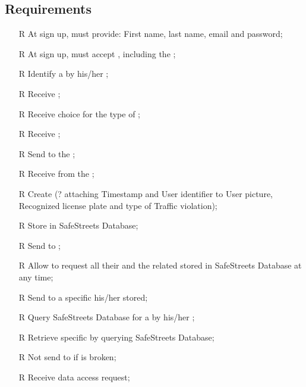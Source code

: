 \documentclass[../../../rasd.tex]{subfiles}
\begin{document}
\subsection{Requirements\label{sect:3.2.5}}
\begin{itemize}
	
	
	\item[R\subs{1}]At sign up,  must provide: First name, last name, email and password;
	\item[R\subs{2}]At sign up,  must accept , including the ;
	\item[R\subs{3}]Identify a  by his/her ;
	\item[R\subs{4}]Receive ;
	\item[R\subs{5}]Receive  choice for the type of ;
	\item[R\subs{6}]Receive ;
	\item[R\subs{7}]Send  to the ;
	\item[R\subs{8}]Receive  from the ;
	\item[R\subs{9}]Create  (? attaching Timestamp and User identifier to User picture, Recognized license plate and type of Traffic violation);
	\item[R\subs{10}]Store  in SafeStreets Database;
	\item[R\subs{11}]Send  to ;
	\item[R\subs{12a}]Allow  to request all their  and the related  stored in SafeStreets Database at any time;
	\item[R\subs{12b}]Send to a specific  his/her  stored;
	\item[R\subs{13}]Query SafeStreets Database for a  by his/her ;
	\item[R\subs{14}]Retrieve specific  by querying SafeStreets Database;
	\item[R\subs{15}]Not send  to  if  is broken;
	\item[R\subs{16}]Receive  data access request;

\end{itemize}
\end{document}
